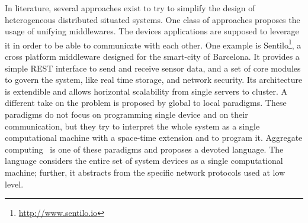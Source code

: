 In literature, several approaches exist to try to simplify the design of heterogeneous distributed situated systems.
One class of approaches proposes the usage of unifying middlewares.
The devices applications are supposed to leverage it in order to be able to communicate with each other.
One example is Sentilo\footnote{\href{http://www.sentilo.io}{http://www.sentilo.io}}, a cross platform middleware designed for the smart-city of Barcelona.
It provides a simple REST interface to send and receive sensor data, and a set of core modules to govern the system, like real time storage, and network security. 
Its architecture is extendible and allows horizontal scalability from single servers to cluster.
A different take on the problem is proposed by global to local paradigms.
These paradigms do not focus on programming single device and on their communication, but they try to interpret the whole system as a single computational machine with a space-time extension and to program it.
Aggregate computing~\cite{BealIEEEComputer2015} is one of these paradigms and proposes a devoted language.
The language considers the entire set of system devices as a single computational machine; further, it abstracts from the specific network protocols used at low level.

